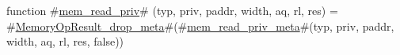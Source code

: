 function #\hyperref[sailRISCVzmemzyreadzypriv]{mem\_read\_priv}# (typ, priv, paddr, width, aq, rl, res) =
  #\hyperref[sailRISCVzMemoryOpResultzydropzymeta]{MemoryOpResult\_drop\_meta}#(#\hyperref[sailRISCVzmemzyreadzyprivzymeta]{mem\_read\_priv\_meta}#(typ, priv, paddr, width, aq, rl, res, false))
